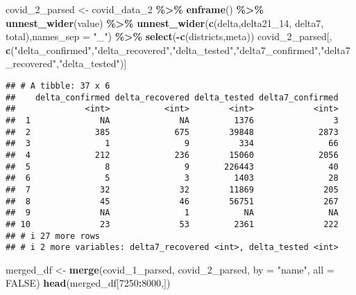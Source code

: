 \documentclass[
]{article}
\newenvironment{Shaded}{\begin{snugshade}}{\end{snugshade}}
\newcommand{\AttributeTok}[1]{\textcolor[rgb]{0.13,0.29,0.53}{#1}}
\newcommand{\ConstantTok}[1]{\textcolor[rgb]{0.56,0.35,0.01}{#1}}
\newcommand{\DecValTok}[1]{\textcolor[rgb]{0.00,0.00,0.81}{#1}}
\newcommand{\FunctionTok}[1]{\textcolor[rgb]{0.13,0.29,0.53}{\textbf{#1}}}
\newcommand{\NormalTok}[1]{#1}
\newcommand{\OtherTok}[1]{\textcolor[rgb]{0.56,0.35,0.01}{#1}}
\newcommand{\SpecialCharTok}[1]{\textcolor[rgb]{0.81,0.36,0.00}{\textbf{#1}}}
\newcommand{\StringTok}[1]{\textcolor[rgb]{0.31,0.60,0.02}{#1}}
\begin{document}
\begin{Shaded}
\begin{Highlighting}[]
\NormalTok{covid\_2\_parsed }\OtherTok{\textless{}{-}}\NormalTok{ covid\_data\_2 }\SpecialCharTok{\%\textgreater{}\%} \FunctionTok{enframe}\NormalTok{() }\SpecialCharTok{\%\textgreater{}\%} \FunctionTok{unnest\_wider}\NormalTok{(value) }\SpecialCharTok{\%\textgreater{}\%} 
  \FunctionTok{unnest\_wider}\NormalTok{(}\FunctionTok{c}\NormalTok{(delta,delta21\_14, delta7, total),}\AttributeTok{names\_sep =} \StringTok{"\_"}\NormalTok{) }\SpecialCharTok{\%\textgreater{}\%} \FunctionTok{select}\NormalTok{(}\SpecialCharTok{{-}}\FunctionTok{c}\NormalTok{(districts,meta))}
\NormalTok{covid\_2\_parsed[, }\FunctionTok{c}\NormalTok{(}\StringTok{"delta\_confirmed"}\NormalTok{,}\StringTok{"delta\_recovered"}\NormalTok{,}\StringTok{"delta\_tested"}\NormalTok{,}\StringTok{"delta7\_confirmed"}\NormalTok{,}\StringTok{"delta7\_recovered"}\NormalTok{,}\StringTok{"delta\_tested"}\NormalTok{)]}
\end{Highlighting}
\end{Shaded}

\begin{verbatim}
## # A tibble: 37 x 6
##    delta_confirmed delta_recovered delta_tested delta7_confirmed
##              <int>           <int>        <int>            <int>
##  1              NA              NA         1376                3
##  2             385             675        39848             2873
##  3               1               9          334               66
##  4             212             236        15060             2056
##  5               8               9       226443               40
##  6               5               3         1403               28
##  7              32              32        11869              205
##  8              45              46        56751              267
##  9              NA               1           NA               NA
## 10              23              53         2361              222
## # i 27 more rows
## # i 2 more variables: delta7_recovered <int>, delta_tested <int>
\end{verbatim}

\begin{Shaded}
\begin{Highlighting}[]
\NormalTok{merged\_df }\OtherTok{\textless{}{-}} \FunctionTok{merge}\NormalTok{(covid\_1\_parsed, covid\_2\_parsed, }\AttributeTok{by =} \StringTok{"name"}\NormalTok{, }\AttributeTok{all =} \ConstantTok{FALSE}\NormalTok{)}
\FunctionTok{head}\NormalTok{(merged\_df[}\DecValTok{7250}\SpecialCharTok{:}\DecValTok{8000}\NormalTok{,])}
\end{Highlighting}
\end{Shaded}
\end{document}
